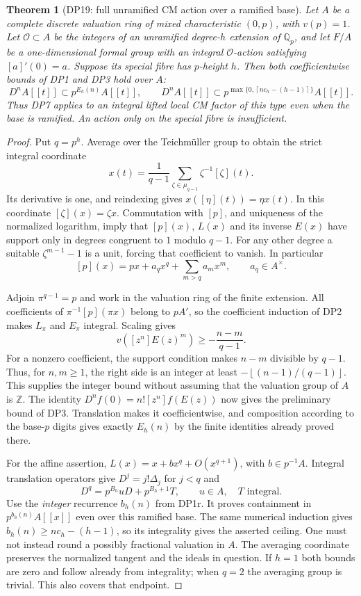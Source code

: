 \documentclass[11pt,a4paper]{article}
\newtheorem{theorem}{Theorem}[section]
\theoremstyle{definition}\newtheorem{remark}[theorem]{Remark}
\newcommand{\Z}{\mathbb Z}\newcommand{\Q}{\mathbb Q}\newcommand{\F}{\mathbb F}
\newcommand{\ceil}[1]{\left\lceil #1\right\rceil}\newcommand{\floor}[1]{\left\lfloor #1\right\rfloor}
\begin{document}
\begin{theorem}[DP19: full unramified CM action over a ramified base]\label{DP19}
Let $A$ be a complete discrete valuation ring of mixed characteristic $(0,p)$, with $v(p)=1$. Let $\mathcal O\subset A$ be the integers of an unramified degree-$h$ extension of $\Q_p$, and let $F/A$ be a one-dimensional formal group with an integral $\mathcal O$-action satisfying $[a]'(0)=a$. Suppose its special fibre has $p$-height $h$. Then both coefficientwise bounds of DP1 and DP3 hold over $A$:
\[
 D^nA[[t]]\subset p^{E_h(n)}A[[t]],\qquad
 D^nA[[t]]\subset p^{\max\{0,\ceil{nc_h-(h-1)}\}}A[[t]].
\]
Thus DP7 applies to an integral lifted local CM factor of this type even when the base is ramified. An action only on the special fibre is insufficient.
\end{theorem}
\begin{proof}
Put $q=p^h$. Average over the Teichm\"uller group to obtain the strict integral coordinate
\[
 x(t)=\frac1{q-1}\sum_{\zeta\in\mu_{q-1}}\zeta^{-1}[\zeta](t).
\]
Its derivative is one, and reindexing gives $x([\eta](t))=\eta x(t)$. In this coordinate $[\zeta](x)=\zeta x$. Commutation with $[p]$, and uniqueness of the normalized logarithm, imply that $[p](x)$, $L(x)$ and its inverse $E(x)$ have support only in degrees congruent to $1$ modulo $q-1$. For any other degree a suitable $\zeta^{m-1}-1$ is a unit, forcing that coefficient to vanish. In particular
\[
 [p](x)=px+a_qx^q+\sum_{m>q}a_mx^m,
 \qquad a_q\in A^\times.
\]

Adjoin $\pi^{q-1}=p$ and work in the valuation ring of the finite extension. All coefficients of $\pi^{-1}[p](\pi x)$ belong to $pA'$, so the coefficient induction of DP2 makes $L_\pi$ and $E_\pi$ integral. Scaling gives
\[
 v([z^n]E(z)^m)\ge-\frac{n-m}{q-1}.
\]
For a nonzero coefficient, the support condition makes $n-m$ divisible by $q-1$. Thus, for $n,m\ge1$, the right side is an integer at least $-\floor{(n-1)/(q-1)}$. This supplies the integer bound without assuming that the valuation group of $A$ is $\Z$. The identity $D^nf(0)=n![z^n]f(E(z))$ now gives the preliminary bound of DP3. Translation makes it coefficientwise, and composition according to the base-$p$ digits gives exactly $E_h(n)$ by the finite identities already proved there.

For the affine assertion, $L(x)=x+bx^q+O(x^{q+1})$, with $b\in p^{-1}A$. Integral translation operators give $D^j=j!\Delta_j$ for $j<q$ and
\[
 D^q=p^{B_h}uD+p^{B_h+1}T,
 \qquad u\in A,\quad T\text{ integral}.
\]
Use the \emph{integer} recurrence $b_h(n)$ from DP1r. It proves containment in $p^{b_h(n)}A[[x]]$ even over this ramified base. The same numerical induction gives $b_h(n)\ge nc_h-(h-1)$, so its integrality gives the asserted ceiling. One must not instead round a possibly fractional valuation in $A$. The averaging coordinate preserves the normalized tangent and the ideals in question. If $h=1$ both bounds are zero and follow already from integrality; when $q=2$ the averaging group is trivial. This also covers that endpoint.
\end{proof}
\end{document}
